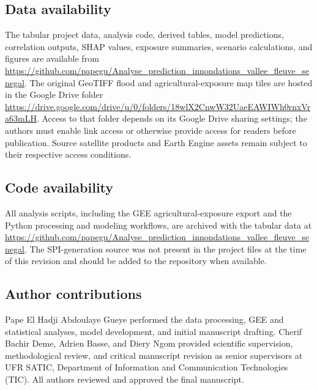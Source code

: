 \documentclass[pdflatex,sn-mathphys,Numbered]{sn-jnl}
\begin{document}
\subsection*{Data availability}
The tabular project data, analysis code, derived tables, model predictions, correlation outputs, SHAP values, exposure summaries, scenario calculations, and figures are available from \url{https://github.com/papegu/Analyse_prediction_innondations_vallee_fleuve_senegal}. The original GeoTIFF flood and agricultural-exposure map tiles are hosted in the Google Drive folder \url{https://drive.google.com/drive/u/0/folders/18wlX2CnwW32UaeEAWIWh0rnxVra63mLH}. Access to that folder depends on its Google Drive sharing settings; the authors must enable link access or otherwise provide access for readers before publication. Source satellite products and Earth Engine assets remain subject to their respective access conditions.

\subsection*{Code availability}
All analysis scripts, including the GEE agricultural-exposure export and the Python processing and modeling workflows, are archived with the tabular data at \url{https://github.com/papegu/Analyse_prediction_innondations_vallee_fleuve_senegal}. The SPI-generation source was not present in the project files at the time of this revision and should be added to the repository when available.

\subsection*{Author contributions}
Pape El Hadji Abdoulaye Gueye performed the data processing, GEE and statistical analyses, model development, and initial manuscript drafting. Cherif Bachir Deme, Adrien Basse, and Diery Ngom provided scientific supervision, methodological review, and critical manuscript revision as senior supervisors at UFR SATIC, Department of Information and Communication Technologies (TIC). All authors reviewed and approved the final manuscript.


\end{document}
